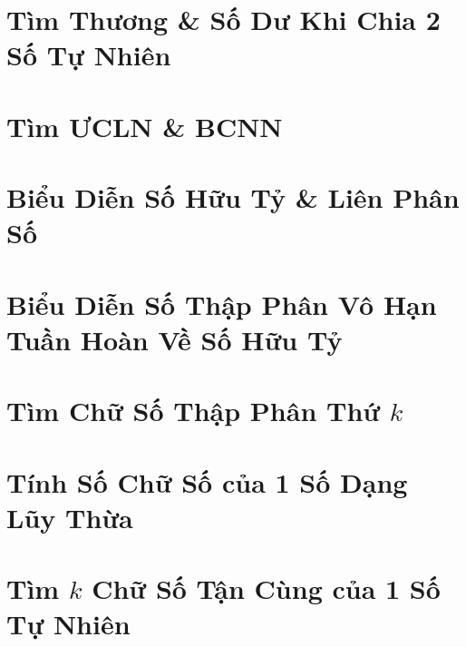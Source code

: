 \documentclass{article}
\begin{document}

\section{Tìm Thương \& Số Dư Khi Chia 2 Số Tự Nhiên}


\section{Tìm ƯCLN \& BCNN}


\section{Biểu Diễn Số Hữu Tỷ \& Liên Phân Số}


\section{Biểu Diễn Số Thập Phân Vô Hạn Tuần Hoàn Về Số Hữu Tỷ}


\section{Tìm Chữ Số Thập Phân Thứ $k$}


\section{Tính Số Chữ Số của 1 Số Dạng Lũy Thừa}


\section{Tìm $k$ Chữ Số Tận Cùng của 1 Số Tự Nhiên}

\end{document}
